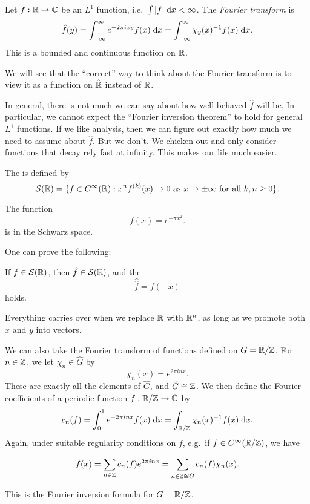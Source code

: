 \documentclass[a4paper]{article}
\begin{document}
\begin{defi}
  Let $f: \mathbb{R} \to \mathbb{C}$ be an $L^1$ function, i.e.\ $\int |f| \;\mathrm{d} x < \infty$. The \emph{Fourier transform} is
  \[
    \hat{f}(y) = \int_{-\infty}^\infty e^{-2\pi i xy} f(x) \;\mathrm{d} x = \int_{-\infty}^\infty \chi_y(x)^{-1} f(x) \;\mathrm{d} x.
  \]
  This is a bounded and continuous function on $\mathbb{R}$.
\end{defi}
We will see that the ``correct'' way to think about the Fourier transform is to view it as a function on $\hat{\mathbb{R}}$ instead of $\mathbb{R}$.

In general, there is not much we can say about how well-behaved $\hat{f}$ will be. In particular, we cannot expect the ``Fourier inversion theorem'' to hold for general $L^1$ functions. If we like analysis, then we can figure out exactly how much we need to assume about $\hat{f}$. But we don't. We chicken out and only consider functions that decay rely fast at infinity. This makes our life much easier.
\begin{defi}
  The  is defined by
  \[
    \mathcal{S}(\mathbb{R}) = \{f \in C^\infty(\mathbb{R}) : x^n f^{(k)}(x) \to 0\text{ as }x \to \pm\infty\text{ for all }k, n\geq 0\}.
  \]
\end{defi}

\begin{eg}
  The function
  \[
    f(x) = e^{-\pi x^2}.
  \]
  is in the Schwarz space.
\end{eg}

One can prove the following:
\begin{prop}
  If $f \in \mathcal{S}(\mathbb{R})$, then $\hat{f} \in \mathcal{S}(\mathbb{R})$, and the 
  \[
    \hat{\hat{f}} = f(-x)
  \]
  holds.
\end{prop}

Everything carries over when we replace $\mathbb{R}$ with $\mathbb{R}^n$, as long as we promote both $x$ and $y$ into vectors.

We can also take the Fourier transform of functions defined on $G = \mathbb{R}/\mathbb{Z}$. For $n \in \mathbb{Z}$, we let $\chi_n \in \hat{G}$ by
\[
  \chi_n(x) = e^{2\pi i nx}.
\]
These are exactly all the elements of $\hat{G}$, and $\hat{G} \cong \mathbb{Z}$. We then define the Fourier coefficients of a periodic function $f: \mathbb{R}/\mathbb{Z} \to \mathbb{C}$ by
\[
  c_n(f) = \int_0^1 e^{-2\pi i n x} f(x) \;\mathrm{d} x = \int_{\mathbb{R}/\mathbb{Z}} \chi_n(x)^{-1} f(x) \;\mathrm{d} x.
\]
Again, under suitable regularity conditions on $f$, e.g.\ if $f \in C^\infty(\mathbb{R}/\mathbb{Z})$, we have
\begin{prop}
  \[
    f(x) = \sum_{n \in \mathbb{Z}} c_n(f) e^{2\pi i nx} = \sum_{n \in \mathbb{Z} \cong \hat{G}} c_n(f) \chi_n(x).
  \]
\end{prop}
This is the Fourier inversion formula for $G = \mathbb{R}/\mathbb{Z}$.
\end{document}
